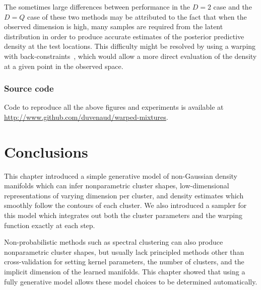 The sometimes large differences between performance in the $D = 2$ case and the $D = Q$ case of these two methods may be attributed to the fact that when the observed dimension is high, many samples are required from the latent distribution in order to produce accurate estimates of the posterior predictive density at the test locations.
This difficulty might be resolved by using a warping with back-constraints~\citep{Lawrence06localdistance}, which would allow a more direct evaluation of the density at a given point in the observed space.




\subsubsection{Source code}
Code to reproduce all the above figures and experiments is available at \\\url{http://www.github.com/duvenaud/warped-mixtures}.


\section{Conclusions}

This chapter introduced a simple generative model of non-Gaussian density manifolds which can infer nonparametric cluster shapes, low-dimensional representations of varying dimension per cluster, and density estimates which smoothly follow the contours of each cluster.
We also introduced a sampler for this model which integrates out both the cluster parameters and the warping function exactly at each step.

Non-probabilistic methods such as spectral clustering can also produce nonparametric cluster shapes, but usually lack principled methods other than cross-validation for setting kernel parameters, the number of clusters, and the implicit dimension of the learned manifolds.
This chapter showed that using a fully generative model allows these model choices to be determined automatically.


